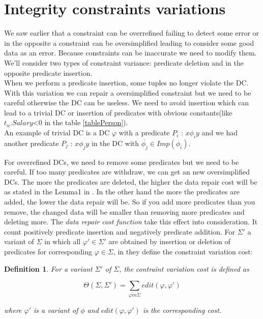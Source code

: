\documentclass[letterpaper, 12pt]{report}
\newtheorem{mydef}{Definition}
\begin{document}
\section{Integrity constraints variations}

We saw earlier that a constraint can be overrefined failing to detect some error or in the opposite a constraint can be oversimplified leading to consider some good data as an error. Because constraints can be inaccurate we need to modify them. We'll consider two types of constraint variance: predicate deletion and in the opposite predicate insertion.\\

When we perform a predicate insertion, some tuples no longer violate the DC. With this variation we can repair a oversimplified constraint but we need to be careful otherwise the DC can be useless. We need to avoid insertion which can lead to a trivial DC or insertion of predicates with obvious constants(like $t_\alpha.Salary$<0 in the table \ref{tablePerson}). \\

An example of trivial DC is a DC $\varphi$ with a predicate $P_i$ : $x \phi_i y$ and we had another predicate $P_j$ : $x \phi_j y$ in the DC with $\overline{\phi_j} \in Imp(\phi_i)$. 

For overrefined DCs, we need to remove some predicates but we need to be careful. If too many predicates are withdraw, we can get an new oversimplified DCs. The more the predicates are deleted, the higher the data repair cost will be as stated in the Lemma1 in \cite{main}. In the other hand the more the predicates are added, the lower the data repair will be. So if you add more predicates than you remove, the changed data will be smaller than removing more predicates and deleting more. The \emph{data repair cost function} take this effect into consideration. It count positively predicate insertion and negatively predicate addition. For $\Sigma '$ a variant of $\Sigma$ in which all $\varphi ' \in \Sigma '$ are obtained by insertion or deletion of predicates for corresponding $\varphi \in \Sigma$, in \cite{main} they define the constraint variation cost:

\begin{mydef}
For a variant $\Sigma '$ of $\Sigma$, the contraint variation cost is defined as

$$\Theta (\Sigma,\Sigma ') = \sum_{\varphi in \Sigma} edit(\varphi,\varphi ')$$

\hspace*{2cm} where $\varphi '$ is a variant of $\phi$ and $edit(\varphi,\varphi ')$ is the corresponding cost.
\end{mydef}
\end{document}
